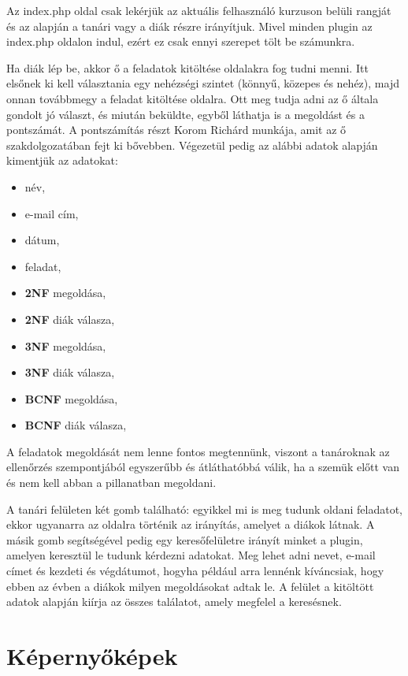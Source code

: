 Az index.php oldal csak lekérjük az aktuális felhasználó kurzuson belüli rangját és az alapján a tanári vagy a diák részre irányítjuk. Mivel minden plugin az index.php oldalon indul, ezért ez csak ennyi szerepet tölt be számunkra. \par
Ha diák lép be, akkor ő a feladatok kitöltése oldalakra fog tudni menni. Itt elsőnek ki kell választania egy nehézségi szintet (könnyű, közepes és nehéz), majd onnan továbbmegy a feladat kitöltése oldalra. Ott meg tudja adni az ő általa gondolt jó választ, és miután beküldte, egyből láthatja is a megoldást és a pontszámát.
A pontszámítás részt Korom Richárd munkája, amit az ő szakdolgozatában fejt ki bővebben.\cite{ricsidoga1}\cite{ricsidoga2}
Végezetül pedig az alábbi adatok alapján kimentjük az adatokat:
\begin{itemize}
    \item név,
    \item e-mail cím,
    \item dátum,
    \item feladat,
    \item \textbf{2NF} megoldása,
    \item \textbf{2NF} diák válasza,
    \item \textbf{3NF} megoldása,
    \item \textbf{3NF} diák válasza,
    \item \textbf{BCNF} megoldása,
    \item \textbf{BCNF} diák válasza,
\end{itemize}

A feladatok megoldását nem lenne fontos megtennünk, viszont a tanároknak az ellenőrzés szempontjából egyszerűbb és átláthatóbbá válik, ha a szemük előtt van és nem kell abban a pillanatban megoldani. \par

A tanári felületen két gomb található: egyikkel mi is meg tudunk oldani feladatot, ekkor ugyanarra az oldalra történik az irányítás, amelyet a diákok látnak. A másik gomb segítségével pedig egy keresőfelületre irányít minket a plugin, amelyen keresztül le tudunk kérdezni adatokat. Meg lehet adni nevet, e-mail címet és kezdeti és végdátumot, hogyha például arra lennénk kíváncsiak, hogy ebben az évben a diákok milyen megoldásokat adtak le. A felület a kitöltött adatok alapján kiírja az összes találatot, amely megfelel a keresésnek.


\section{Képernyőképek}

